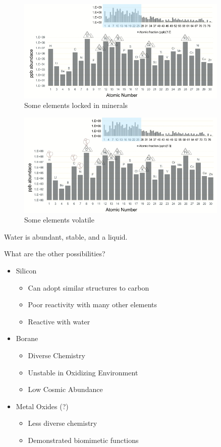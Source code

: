 \documentclass[]{article}
\begin{document}
\begin{figure}[H]
	\caption{Some elements locked in minerals}\label{fig:minerals} 
	\includegraphics[width=0.9\textwidth]{AbundancesMinerals}
\end{figure}

\begin{figure}[H]
	\caption{Some elements volatile}\label{fig:volatiles} 
	\includegraphics[width=0.9\textwidth]{AbundancesGases}
\end{figure}

Water is abundant, stable, and a liquid.

What are the other possibilities?
\begin{itemize}
	\item Silicon
	\begin{itemize}
		\item Can adopt similar structures to carbon
		\item Poor reactivity with many other elements
		\item Reactive with water
	\end{itemize}
	\item Borane
	\begin{itemize}
		\item Diverse Chemistry
		\item Unstable in Oxidizing Environment
		\item Low Cosmic Abundance
	\end{itemize}
	\item Metal Oxides (?)
\begin{itemize}
	\item 	Less diverse chemistry
	\item Demonstrated biomimetic functions
\end{itemize}
\end{itemize}
\end{document}

